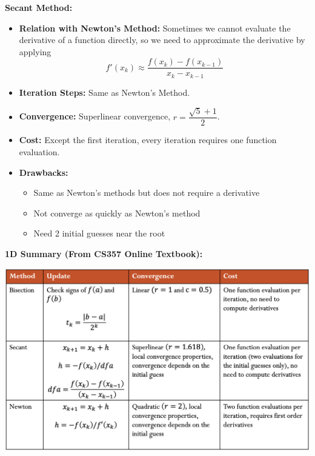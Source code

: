 \documentclass[12pt]{article}
\begin{document}
\medskip
\noindent \textbf{Secant Method:} 
\begin{itemize}
    \item \textbf{Relation with Newton's Method:} Sometimes we cannot evaluate the derivative of a function directly, so we need to approximate the derivative by applying
    $$f'(x_k) \approx \frac{f(x_k) - f (x_{k-1})}{x_k - x_{k-1}}$$
    \item \textbf{Iteration Steps: }Same as Newton's Method.
    \item \textbf{Convergence:} Superlinear convergence, $r = \dfrac{\sqrt{5}+1}{2}$.
    \item \textbf{Cost:} Except the first iteration, every iteration requires one function evaluation.
    \item \textbf{Drawbacks:}
        \begin{itemize}
            \item Same as Newton's methods but does not require a derivative
            \item Not converge as quickly as Newton's method
            \item Need 2 initial guesses near the root
        \end{itemize}
\end{itemize}

\newpage
\noindent \textbf{1D Summary (From CS357 Online Textbook):}
    \begin{center}
    \includegraphics[width= 1\linewidth]{1Dsummaries.png}
    \end{center}
\end{document}
